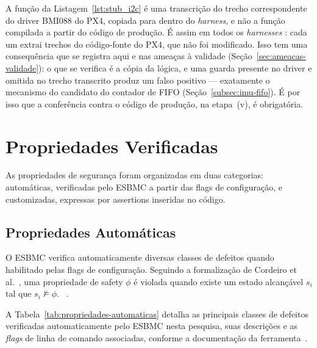 A função da Listagem~\ref{lst:stub_i2c} é uma transcrição do trecho
correspondente do driver BMI088 do PX4, copiada para dentro do
\textit{harness}, e não a função compilada a partir do código de produção. É assim
em todos os \textit{harnesses} : cada um extrai trechos do código-fonte do PX4,
que não foi modificado. Isso tem uma consequência que se registra aqui e nas
ameaças à validade (Seção~\ref{sec:ameacas-validade}): o que se verifica é a
cópia da lógica, e uma guarda presente no driver e omitida no trecho transcrito
produz um falso positivo --- exatamente o mecanismo do candidato do contador de
FIFO (Seção~\ref{subsec:imu-fifo}). É por isso que a conferência contra o código
de produção, na etapa~(v), é obrigatória. 

\section{Propriedades Verificadas}
\label{sec:propriedades}

As propriedades de segurança foram organizadas em duas categorias: automáticas,
verificadas pelo ESBMC a partir das flags de configuração, e customizadas,
expressas por assertions inseridas no código.

\subsection{Propriedades Automáticas}

O ESBMC verifica automaticamente diversas classes de defeitos quando habilitado
pelas flags de configuração. Seguindo a formalização de Cordeiro et al.~\cite{Cordeiro2012}, uma propriedade de safety $\phi$ é violada quando existe um estado alcançável $s_i$ tal que $s_i \not\models \phi$. ~\cite{Menezes2024}.

A Tabela~\ref{tab:propriedades-automaticas} detalha as principais classes de defeitos verificadas automaticamente pelo ESBMC nesta pesquisa, suas descrições e as \textit{flags} de linha de comando associadas, conforme a documentação da ferramenta~\cite{Menezes2024}.

